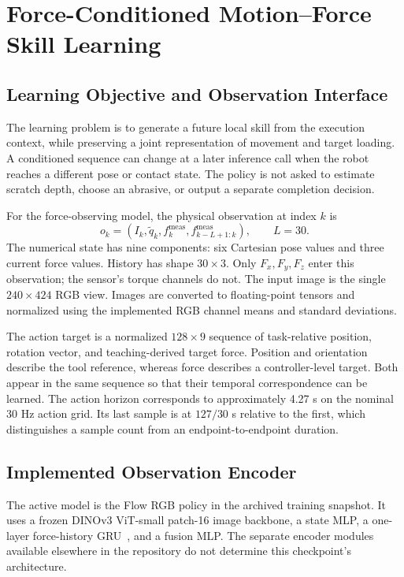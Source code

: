 \chapter{Force-Conditioned Motion--Force Skill Learning}
\label{chap:force_il}

\section{Learning Objective and Observation Interface}
The learning problem is to generate a future local skill from the execution context, while preserving a joint representation of movement and target loading. A conditioned sequence can change at a later inference call when the robot reaches a different pose or contact state. The policy is not asked to estimate scratch depth, choose an abrasive, or output a separate completion decision.

For the force-observing model, the physical observation at index \(k\) is
\begin{equation}
 o_k=\left(I_k,\widetilde q_k,f_k^{\mathrm{meas}},
       f_{k-L+1:k}^{\mathrm{meas}}\right),\qquad L=30.
 \label{eq:il_observation}
\end{equation}
The numerical state has nine components: six Cartesian pose values and three current force values. History has shape \(30\times3\). Only \(F_x,F_y,F_z\) enter this observation; the sensor's torque channels do not. The input image is the single \(240\times424\) RGB view. Images are converted to floating-point tensors and normalized using the implemented RGB channel means and standard deviations.

The action target is a normalized \(128\times9\) sequence of task-relative position, rotation vector, and teaching-derived target force. Position and orientation describe the tool reference, whereas force describes a controller-level target. Both appear in the same sequence so that their temporal correspondence can be learned. The action horizon corresponds to approximately 4.27 s on the nominal 30 Hz action grid. Its last sample is at \(127/30\) s relative to the first, which distinguishes a sample count from an endpoint-to-endpoint duration.

\section{Implemented Observation Encoder}
The active model is the Flow RGB policy in the archived training snapshot. It uses a frozen DINOv3 ViT-small patch-16 image backbone, a state MLP, a one-layer force-history GRU~\cite{cho2014gru}, and a fusion MLP. The separate encoder modules available elsewhere in the repository do not determine this checkpoint's architecture.

